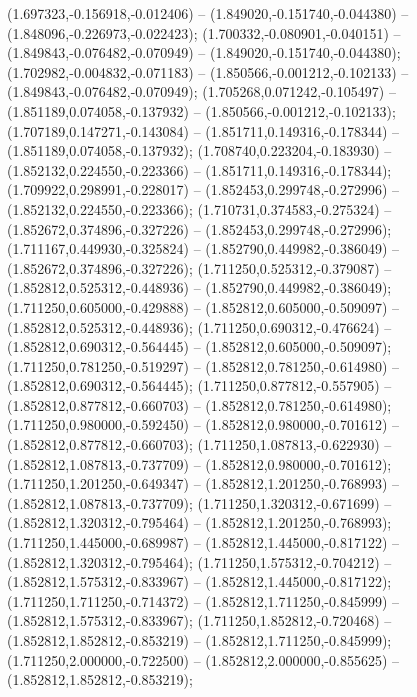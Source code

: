  (1.697323,-0.156918,-0.012406) -- (1.849020,-0.151740,-0.044380) -- (1.848096,-0.226973,-0.022423);
 (1.700332,-0.080901,-0.040151) -- (1.849843,-0.076482,-0.070949) -- (1.849020,-0.151740,-0.044380);
 (1.702982,-0.004832,-0.071183) -- (1.850566,-0.001212,-0.102133) -- (1.849843,-0.076482,-0.070949);
 (1.705268,0.071242,-0.105497) -- (1.851189,0.074058,-0.137932) -- (1.850566,-0.001212,-0.102133);
 (1.707189,0.147271,-0.143084) -- (1.851711,0.149316,-0.178344) -- (1.851189,0.074058,-0.137932);
 (1.708740,0.223204,-0.183930) -- (1.852132,0.224550,-0.223366) -- (1.851711,0.149316,-0.178344);
 (1.709922,0.298991,-0.228017) -- (1.852453,0.299748,-0.272996) -- (1.852132,0.224550,-0.223366);
 (1.710731,0.374583,-0.275324) -- (1.852672,0.374896,-0.327226) -- (1.852453,0.299748,-0.272996);
 (1.711167,0.449930,-0.325824) -- (1.852790,0.449982,-0.386049) -- (1.852672,0.374896,-0.327226);
 (1.711250,0.525312,-0.379087) -- (1.852812,0.525312,-0.448936) -- (1.852790,0.449982,-0.386049);
 (1.711250,0.605000,-0.429888) -- (1.852812,0.605000,-0.509097) -- (1.852812,0.525312,-0.448936);
 (1.711250,0.690312,-0.476624) -- (1.852812,0.690312,-0.564445) -- (1.852812,0.605000,-0.509097);
 (1.711250,0.781250,-0.519297) -- (1.852812,0.781250,-0.614980) -- (1.852812,0.690312,-0.564445);
 (1.711250,0.877812,-0.557905) -- (1.852812,0.877812,-0.660703) -- (1.852812,0.781250,-0.614980);
 (1.711250,0.980000,-0.592450) -- (1.852812,0.980000,-0.701612) -- (1.852812,0.877812,-0.660703);
 (1.711250,1.087813,-0.622930) -- (1.852812,1.087813,-0.737709) -- (1.852812,0.980000,-0.701612);
 (1.711250,1.201250,-0.649347) -- (1.852812,1.201250,-0.768993) -- (1.852812,1.087813,-0.737709);
 (1.711250,1.320312,-0.671699) -- (1.852812,1.320312,-0.795464) -- (1.852812,1.201250,-0.768993);
 (1.711250,1.445000,-0.689987) -- (1.852812,1.445000,-0.817122) -- (1.852812,1.320312,-0.795464);
 (1.711250,1.575312,-0.704212) -- (1.852812,1.575312,-0.833967) -- (1.852812,1.445000,-0.817122);
 (1.711250,1.711250,-0.714372) -- (1.852812,1.711250,-0.845999) -- (1.852812,1.575312,-0.833967);
 (1.711250,1.852812,-0.720468) -- (1.852812,1.852812,-0.853219) -- (1.852812,1.711250,-0.845999);
 (1.711250,2.000000,-0.722500) -- (1.852812,2.000000,-0.855625) -- (1.852812,1.852812,-0.853219);
